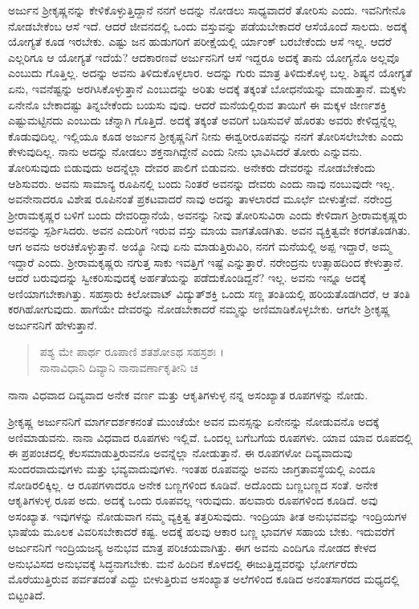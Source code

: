 ಅರ್ಜುನ ಶ್ರೀಕೃಷ್ಣನನ್ನು ಕೇಳಿಕೊಳ್ಳುತ್ತಿದ್ದಾನೆ ನನಗೆ ಅದನ್ನು ನೋಡಲು ಸಾಧ್ಯವಾದರೆ ತೋರಿಸು ಎಂದು. ಇವನಿಗೇನೊ ನೋಡಬೇಕೆಂಬ ಆಸೆ ಇದೆ. ಆದರೆ ಜೀವನದಲ್ಲಿ ಒಂದು ವಸ್ತುವನ್ನು ಪಡೆಯಬೇಕಾದರೆ ಆಸೆಯೊಂದೆ ಸಾಲದು. ಅದಕ್ಕೆ ಯೋಗ್ಯತೆ ಕೂಡ ಇರಬೇಕು. ಎಷ್ಟು ಜನ ಹುಡುಗರಿಗೆ ಪರೀಕ್ಷೆಯಲ್ಲಿ ರ್ಯಾಂಕ್ ಬರಬೇಕೆಂದು ಆಸೆ ಇಲ್ಲ. ಆದರೆ ಎಲ್ಲರಿಗೂ ಆ ಯೋಗ್ಯತೆ ಇದೆಯೆ? ಆದಕಾರಣವೆ ಅರ್ಜುನನಿಗೆ ಆಸೆ ಇದ್ದರೂ ಅದಕ್ಕೆ ತಾನು ಯೋಗ್ಯನೊ ಅಲ್ಲವೊ ಎಂಬುದು ಗೊತ್ತಿಲ್ಲ. ಅದನ್ನು ಅವನು ತಿಳಿದುಕೊಳ್ಳಲಾರ. ಅದನ್ನು ಗುರು ಮಾತ್ರ ತಿಳಿದುಕೊಳ್ಳ ಬಲ್ಲ. ಶಿಷ್ಯನ ಯೋಗ್ಯತೆ ಏನು, ಇವನೆಷ್ಟನ್ನು ಅರಗಿಸಿಕೊಳ್ಳುತ್ತಾನೆ ಎಂಬುದನ್ನು ಅರಿತು ಅದಕ್ಕೆ ತಕ್ಕಂತೆ ಬೋಧನೆಯನ್ನು ಮಾಡುತ್ತಾನೆ. ಮಕ್ಕಳು ಏನೇನೊ ಬೇಕಾದಷ್ಟು ತಿನ್ನಬೇಕೆಂದು ಬಯಸು ವುವು. ಆದರೆ ಮನೆಯಲ್ಲಿರುವ ತಾಯಿಗೆ ಈ ಮಕ್ಕಳ ಜೀರ್ಣಶಕ್ತಿ ಎಷ್ಟುಮಟ್ಟಿನದು ಎಂಬುದು ಚೆನ್ನಾಗಿ ಗೊತ್ತಿದೆ. ಅದಕ್ಕೆ ತಕ್ಕಂತೆ ಅವರಿಗೆ ಬಡಿಸುವಳೆ ಹೊರತು ಅವರು ಕೇಳಿದ್ದನ್ನೆಲ್ಲ ಕೊಡುವುದಿಲ್ಲ. ಇಲ್ಲಿಯೂ ಕೂಡ ಅರ್ಜುನ ಶ್ರೀಕೃಷ್ಣನಿಗೆ ನೀನು ಈಶ್ವರೀರೂಪವನ್ನು ನನಗೆ ತೋರಿಸಲೇಬೇಕು ಎಂದು ಕೇಳುವುದಿಲ್ಲ. ನಾನು ಅದನ್ನು ನೋಡಲು ಶಕ್ತನಾಗಿದ್ದೇನೆ ಎಂದು ನೀನು ಭಾವಿಸಿದರೆ ತೋರು ಎನ್ನುವನು. ತೋರಿಸುವುದು ಬಿಡುವುದು ಅದನ್ನೆಲ್ಲಾ ದೇವರ ಪಾಲಿಗೆ ಬಿಡುವನು. ಅನೇಕರು ದೇವರನ್ನು ನೋಡಬೇಕೆಂದು ಆಶಿಸುವರು. ಅವನು ಸಾಮಾನ್ಯ ರೂಪಿನಲ್ಲಿ ಬಂದು ನಿಂತರೆ ಅವನನ್ನು ದೇವರು ಎಂದು ನಾವು ನಂಬುವುದೇ ಇಲ್ಲ. ಅವನೇನಾದರೂ ವಿಶೇಷ ರೂಪಿನಂತೆ ಪ್ರಕಟವಾದರೆ ನಾವು ಅದನ್ನು ತಾಳಲಾರದೆ ಮೂರ್ಛೆ ಬೀಳುತ್ತೇವೆ. ನರೇಂದ್ರ ಶ್ರೀರಾಮಕೃಷ್ಣರ ಬಳಿಗೆ ಬಂದು ದೇವರಿದ್ದಾನೆಯೆ, ಅವನನ್ನು ನೀವು ತೋರಿಸುವಿರಾ ಎಂದು ಕೇಳಿದಾಗ ಶ್ರೀರಾಮಕೃಷ್ಣರು ಅವನನ್ನು ಸ್ಪರ್ಶಿಸಿದರು. ಅವನ ಎದುರಿಗೆ ಇರುವ ವಸ್ತು ಮಾಯ ವಾಗತೊಡಗಿತು. ಅವನ ವ್ಯಕ್ತಿತ್ವವೇ ಕರಗತೊಡಗಿತು. ಆಗ ಅವನು ಅರಚಿಕೊಳ್ಳುತ್ತಾನೆ. ಅಯ್ಯೊ ನೀವು ಏನು ಮಾಡುತ್ತಿರುವಿರಿ, ನನಗೆ ಮನೆಯಲ್ಲಿ ಅಪ್ಪ ಇದ್ದಾರೆ, ಅಮ್ಮ ಇದ್ದಾರೆ ಎಂದು. ಶ್ರೀರಾಮಕೃಷ್ಣರು ನಗುತ್ತ ಸಾಕು ಇವತ್ತಿಗೆ ಇಷ್ಟೆ ಎನ್ನುತ್ತಾರೆ. ನರೇಂದ್ರನು ಉತ್ಸಾಹದಿಂದ ಕೇಳುತ್ತಾನೆ. ಆದರೆ ಬರುವುದನ್ನು ಸ್ವೀಕರಿಸುವುದಕ್ಕೆ ಅರ್ಹತೆಯನ್ನು ಪಡೆದುಕೊಂಡಿದ್ದನೆ? ಇಲ್ಲ. ಅವನು ಇನ್ನೂ ಅದಕ್ಕೆ ಅಣಿಯಾಗಬೇಕಾಗಿತ್ತು. ಸಹಸ್ರಾರು ಕಿಲೋವಾಟ್ ವಿದ್ಯುತ್​ಶಕ್ತಿ ಒಂದು ಸಣ್ಣ ತಂತಿಯಲ್ಲಿ ಹರಿಯತೊಡಗಿದರೆ, ಆ ತಂತಿ ಕರಗಿಹೋಗುವುದು. ಹಾಗೆಯೇ ದೇವರನ್ನು ನೋಡಬೇಕಾದರೆ ನಮ್ಮನ್ನು ಅಣಿಮಾಡಿಕೊಳ್ಳಬೇಕು. ಆಗಲೇ ಶ್ರೀಕೃಷ್ಣ ಅರ್ಜುನನಿಗೆ ಹೇಳುತ್ತಾನೆ.

\begin{verse}
ಪಶ್ಯ ಮೇ ಪಾರ್ಥ ರೂಪಾಣಿ ಶತಶೋಽಥ ಸಹಸ್ರಶಃ ।\\ನಾನಾವಿಧಾನಿ ದಿವ್ಯಾನಿ ನಾನಾವರ್ಣಾಕೃತೀನಿ ಚ 
\end{verse}

{\small ನಾನಾ ವಿಧವಾದ ದಿವ್ಯವಾದ ಅನೇಕ ವರ್ಣ ಮತ್ತು ಆಕೃತಿಗಳುಳ್ಳ ನನ್ನ ಅಸಂಖ್ಯಾತ ರೂಪಗಳನ್ನು ನೋಡು.}

ಶ್ರೀಕೃಷ್ಣ ಅರ್ಜುನನಿಗೆ ಮಾರ್ಗದರ್ಶಕನಂತೆ ಮುಂಚೆಯೇ ಅವನ ಮನಸ್ಸನ್ನು ಏನೇನನ್ನು ನೋಡುವನೊ ಅದಕ್ಕೆ ಅಣಿಮಾಡುವನು. ನಾನಾ ವಿಧವಾದ ರೂಪಗಳು ಇಲ್ಲಿವೆ. ಒಂದಲ್ಲ ಬಗೆಬಗೆಯ ರೂಪಗಳು. ಯಾವ ಯಾವ ರೂಪದಲ್ಲಿ ಈ ಪ್ರಪಂಚದಲ್ಲಿ ಕೆಲಸಮಾಡುತ್ತಿರುವನೊ ಅವನ್ನೆಲ್ಲಾ ನೋಡುತ್ತಾನೆ. ಈ ರೂಪಗಳೋ ದಿವ್ಯವಾದುವು ಸುಂದರವಾದುವುಗಳು ಮತ್ತು ಭವ್ಯವಾದುವುಗಳು. ಇಂತಹ ರೂಪವನ್ನು ಅವನು ಜಾಗ್ರತಾವಸ್ಥೆಯಲ್ಲಿ ಎಂದೂ ನೋಡಿರಲಿಕ್ಕಿಲ್ಲ. ಆ ರೂಪಗಳಾದರೂ ಅನೇಕ ಬಣ್ಣಗಳಿಂದ ಕೂಡಿವೆ. ಅದೊಂದು ಬಣ್ಣಬಣ್ಣದ ಸಂತೆ. ಅನೇಕ ಆಕೃತಿಗಳುಳ್ಳ ರೂಪ ಅದು. ಅದಕ್ಕೆ ಒಂದು ರೂಪವಲ್ಲ ಇರುವುದು. ಹಲವಾರು ರೂಪಗಳಿಂದ ಕೂಡಿದೆ. ಅವು ಅಸಂಖ್ಯಾತ. ಇವುಗಳನ್ನು ನೋಡುವಾಗ ನಮ್ಮ ವ್ಯಕ್ತಿತ್ವ ತತ್ತರಿಸುವುದು. ಇಂದ್ರಿಯಾ ತೀತ ಅನುಭವವನ್ನು ಇಂದ್ರಿಯಗಳ ಭಾಷೆಯ ಮೂಲಕ ವಿವರಿಸಬೇಕಾದರೆ ಕಷ್ಟ. ಅದಕ್ಕೆ ಹಲವು ಆಕಾರ ಬಣ್ಣ ಭಾವಗಳ ಸಹಾಯ ಬೇಕು. ಇದುವರೆಗೆ ಅರ್ಜುನನಿಗೆ ಇಂದ್ರಿಯಜನ್ಯ ಅನುಭವ ಮಾತ್ರ ಪರಿಚಯವಾಗಿತ್ತು. ಈಗ ಅವನು ಎಂದಿಗೂ ನೋಡದ ಕೇಳದ ಅನುಭವಿಸದ ಅನುಭವಕ್ಕೆ ಸಿದ್ಧನಾಗಬೇಕು. ಮನೆ ಹಿಂದಿನ ಕೊಳದಲ್ಲಿ ಈಜುತ್ತಿದ್ದವರನ್ನು ಭೋರ್ಗರೆದು ಮೊರೆಯುತ್ತಿರುವ ಪರ್ವತದಂತೆ ಎದ್ದು ಬೀಳುತ್ತಿರುವ ಅಸಂಖ್ಯಾತ ಅಲೆಗಳಿಂದ ಕೂಡಿದ ಅನಂತಸಾಗರದ ಮಧ್ಯದಲ್ಲಿ ಬಿಟ್ಟಂತಿದೆ.

